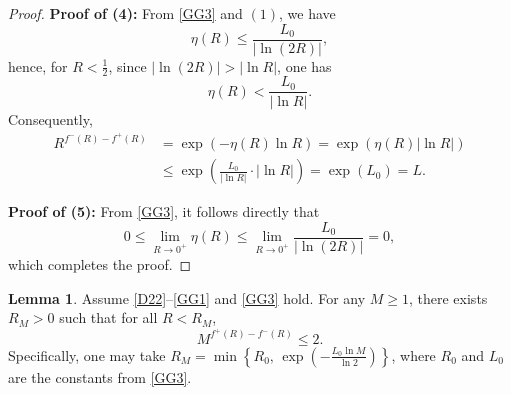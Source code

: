 \documentclass[10pt,reqno]{amsart}
\newcommand *\w{^\wedge}
\theoremstyle{definition}
\newtheorem{lemma}[theorem]{Lemma}
\numberwithin{equation}{section}
\begin{document}
\begin{proof}
\textbf{Proof of (4):}
From \eqref{GG3} and $(1)$, we have
\[
\eta(R) \leq \frac{L_0}{|\ln(2R)|},
\]
hence, for $R < \frac{1}{2}$, since $|\ln(2R)| > |\ln R|$, one has 
\begin{equation}\label{eq1eq1eq1}
\eta(R) < \frac{L_0 }{ |\ln R|}. 
\end{equation}
Consequently,
\begin{align*}
R^{f^-(R) - f^+(R)} &= \exp\left( -\eta(R) \ln R \right) = \exp\left( \eta(R) |\ln R| \right) \\
&\leq \exp\left( \frac{L_0}{|\ln R|} \cdot |\ln R| \right) = \exp(L_0) = L.
\end{align*}

\textbf{Proof of (5):}
From \eqref{GG3}, it follows directly that
\[
0 \leq \lim_{R \to 0^+} \eta(R) \leq \lim_{R \to 0^+} \frac{L_0}{|\ln(2R)|} = 0,
\]
which completes the proof.
\end{proof}
\begin{lemma} \label{remff}
Assume \eqref{D22}--\eqref{GG1} and \eqref{GG3} hold. For any $M \geq 1$, there exists $R_M > 0$ such that for all $R < R_M$,
\[
M^{f^+(R) - f^-(R)} \leq 2.
\]
Specifically, one may take $R_M = \min\left\{ R_0,\, \exp\left( -\frac{L_0 \ln M}{\ln 2} \right) \right\}$, where $R_0$ and $L_0$ are the constants from \eqref{GG3}.
\end{lemma}
\end{document}
